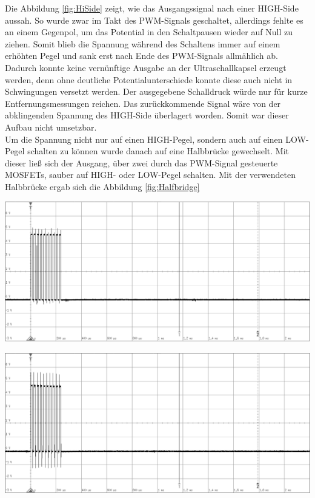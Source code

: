 Die Abbildung \ref{fig:HiSide} zeigt, wie das Ausgangssignal nach einer HIGH-Side aussah. So wurde zwar im Takt des PWM-Signals geschaltet, allerdings fehlte es an einem Gegenpol, um das Potential in den Schaltpausen wieder auf Null zu ziehen. Somit blieb die Spannung während des Schaltens immer auf einem erhöhten Pegel und sank erst nach Ende des PWM-Signals allmählich ab. Dadurch konnte keine vernünftige Ausgabe an der Ultraschallkapsel erzeugt werden, denn ohne deutliche Potentialunterschiede konnte diese auch nicht in Schwingungen versetzt werden. Der ausgegebene Schalldruck würde nur für kurze Entfernungsmessungen reichen. Das zurückkommende Signal wäre von der abklingenden Spannung des HIGH-Side überlagert worden. Somit war dieser Aufbau nicht umsetzbar.\\
Um die Spannung nicht nur auf einen HIGH-Pegel, sondern auch auf einen LOW-Pegel schalten zu können wurde danach auf eine Halbbrücke gewechselt. Mit dieser ließ sich der Ausgang, über zwei durch das PWM-Signal gesteuerte MOSFETs, sauber auf HIGH- oder LOW-Pegel schalten. 
Mit der verwendeten Halbbrücke ergab sich die Abbildung \ref{fig:Halfbridge}\\
\begin{minipage}{0.46\textwidth}
\includegraphics[width=1\textwidth%
]{Abbildungen/MessungenP1/PWM-Nach-der-Halbbrucke.png}
\label{fig:Halfbridge}
\end{minipage}\qquad
\begin{minipage}{0.46\textwidth}
\includegraphics[width=1\textwidth%
]{Abbildungen/MessungenP1/PWM-Nach-der-Halbbrucke-mit-LS.png}
\label{fig:Senderausgabe}
\end{minipage}\\
